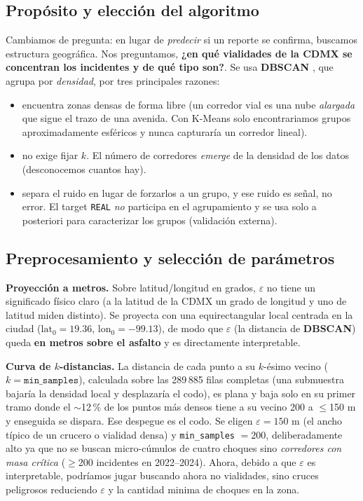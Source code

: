 \documentclass[11pt,letterpaper]{article}
\begin{document}
\subsection{Propósito y elección del algoritmo}

Cambiamos de pregunta: en lugar de \emph{predecir} si un reporte se confirma,
buscamos estructura geográfica. Nos preguntamos, \textbf{¿en qué vialidades de la CDMX se
concentran los incidentes y de qué tipo son?}. Se usa \textbf{DBSCAN} \cite{dbscan}, que agrupa por
\emph{densidad}, por tres principales razones:

\begin{itemize}
  \item encuentra zonas densas de forma libre (un corredor vial es una nube
  \emph{alargada} que sigue el trazo de una avenida. Con K-Means solo encontrariamos grupos
  aproximadamente esféricos y nunca capturaría un corredor lineal).
  \item no exige fijar $k$. El número de corredores \emph{emerge} de la densidad de
  los datos (desconocemos cuantos hay).
  \item separa el ruido en lugar de forzarlos a un grupo, y ese ruido es señal, no error. El target \texttt{REAL}
  \emph{no} participa en el agrupamiento y se usa solo a posteriori para caracterizar
  los grupos (validación externa).
\end{itemize}

\subsection{Preprocesamiento y selección de parámetros}

\textbf{Proyección a metros.} Sobre latitud/longitud en grados, $\varepsilon$
no tiene un significado físico claro (a la latitud de la CDMX un grado de
longitud y uno de latitud miden distinto). Se proyecta con una equirectangular
local centrada en la ciudad ($\text{lat}_0 = 19.36$,
$\text{lon}_0 = -99.13$), de modo que $\varepsilon$ (la distancia de \textbf{DBSCAN}) queda \textbf{en metros
sobre el asfalto} y es directamente interpretable.

\textbf{Curva de $k$-distancias.} La distancia de cada punto a su $k$-ésimo
vecino ($k = \texttt{min\_samples}$), calculada sobre las 289\,885 filas
completas (una submuestra bajaría la densidad local y desplazaría el codo),
es plana y baja solo en su primer tramo donde el $\sim$12\,\% de los puntos más
densos tiene a su vecino 200 a $\leq$150 m y enseguida se dispara. Ese
despegue es el codo. Se eligen $\varepsilon = 150$ m (el ancho típico de un
crucero o vialidad densa) y \texttt{min\_samples} $= 200$, deliberadamente
alto ya que no se buscan micro-cúmulos de cuatro choques sino \emph{corredores con
masa crítica} ($\geq$200 incidentes en 2022--2024). Ahora, debido a que $\varepsilon$
es interpretable, podríamos jugar buscando ahora no vialidades, sino cruces peligrosos
reduciendo $\varepsilon$ y la cantidad minima de choques en la zona. 
\end{document}
